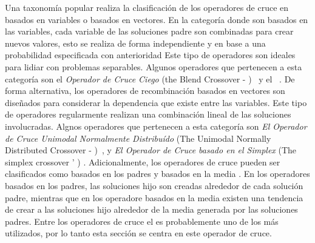 Una taxonomía popular realiza la clasificación de los operadores de cruce en basados en variables o basados en vectores.
%
En la categoría donde son basados en las variables, cada variable de las soluciones padre son combinadas para crear nuevos valores, esto se realiza de forma independiente y en base a una probabilidad especificada con anterioridad 
%
Este tipo de operadores son ideales para lidiar con problemas separables.
%
Algunos operadores que pertenecen a esta categoría son el \textit{Operador de Cruce Ciego} (the Blend Crossover - \BLX{})~\cite{eshelman1993real} y el \SBX~\cite{Joel:SBX1994}.
%
De forma alternativa, los operadores de recombinación basados en vectores son diseñados para considerar la dependencia que existe entre las variables.
%
Este tipo de operadores regularmente realizan una combinación lineal de las soluciones involucradas.
%
Algnos operadores que pertenecen a esta categoría son \textit{El Operador de Cruce Unimodal Normalmente Distribuído} (The Unimodal Normally Distributed Crossover - \UNDX{})~\cite{Joel:UNDX}, y \textit{El Operador de Cruce basado en el Simplex} (The simplex crossover ' \SPX{}) \cite{Joel:DE_Storn_SPX}.
%
Adicionalmente, los operadores de cruce pueden ser clasificados como basados en los padres y basados en la media \cite{jain2011parent}.
%
En los operadores basados en los padres, las soluciones hijo son creadas alrededor de cada solución padre, mientras que en los operadore basados en la media existen una tendencia de crear a las soluciones hijo alrededor de la media generada por las soluciones padres.
%
Entre los operadores de cruce el \SBX{} es probablemente uno de los más utilizados, por lo tanto esta sección se centra en este operador de cruce.

